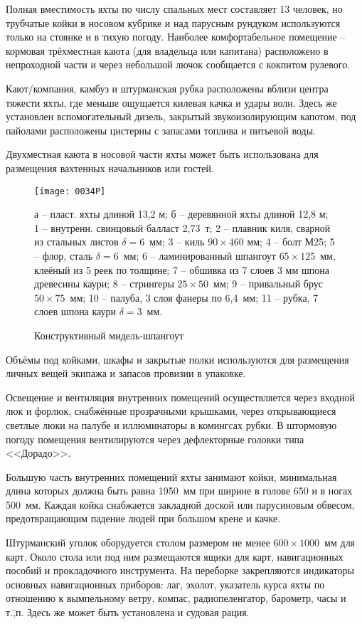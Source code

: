 Полная вместимость яхты по числу спальных мест составляет 13 человек,
но трубчатые койки в носовом кубрике и над парусным рундуком
используются только на стоянке и в тихую погоду. Наиболее
комфортабельное помещение \--- кормовая трёхместная каюта (для
владельца или капитана) расположено в непроходной части и через
небольшой лючок сообщается с кокпитом рулевого.

Кают\-/компания, камбуз и штурманская рубка расположены вблизи центра
тяжести яхты, где меньше ощущается килевая качка и удары волн. Здесь
же установлен вспомогательный дизель, закрытый звукоизолирующим
капотом, под пайолами расположены цистерны с запасами топлива и
питьевой воды.

Двухместная каюта в носовой части яхты может быть использована для
размещения вахтенных начальников или гостей.

\begin{figure}
  \centering
  \texttt{[image: 0034P]}
  \caption{Конструктивный мидель-шпангоут}
  \label{fig:34}
  \footnotesize
  \centering{}
а \--- пласт. яхты длиной 13,2 м; б \--- деревянной яхты длиной 12,8 м; 
1 \--- внутренн. свинцовый балласт 2,73~т; 2 \--- плавник киля, сварной из стальных листов $\delta = 6$~мм; 3 \--- киль $90 \times 460$ мм; 4 \--- болт М25; 5 \--- флор, сталь $\delta = 6$~мм; 6 \--- ламинированный шпангоут $65 \times 125$~мм, клеёный из 5 реек по толщине; 7 \--- обшивка из 7 слоев 3 мм шпона древесины каури; 8 \--- стрингеры $25 \times 50$~мм; 9 \--- привальный брус $50 \times 75$~мм; 10 \--- палуба, 3 слоя фанеры по 6,4~мм; 11 \--- рубка, 7 слоев шпона каури $\delta = 3$~мм. 
\end{figure}

Объёмы под койками, шкафы и закрытые полки используются для размещения
личных вещей экипажа и запасов провизии в упаковке.

Освещение и вентиляция внутренних помещений осуществляется через
входной люк и форлюк, снабжённые прозрачными крышками, через
открывающиеся светлые люки на палубе и иллюминаторы в комингсах
рубки. В штормовую погоду помещения вентилируются через дефлекторные
головки типа <<Дорадо>>.

Большую часть внутренних помещений яхты занимают койки, минимальная
длина которых должна быть равна 1950~мм при ширине в голове 650 и в
ногах 500~мм. Каждая койка снабжается закладной доской или парусиновым
обвесом, предотвращающим падение людей при большом крене и качке.

Штурманский уголок оборудуется столом размером не менее
$600 \times 1000$~мм для карт. Около стола или под ним размещаются
ящики для карт, навигационных пособий и прокладочного инструмента. На
переборке закрепляются индикаторы основных навигационных приборов:
лаг, эхолот, указатель курса яхты по
отношению к вымпельному ветру, компас,
радиопеленгатор, барометр, часы
и т.\=,п. Здесь же может быть установлена и судовая рация.

